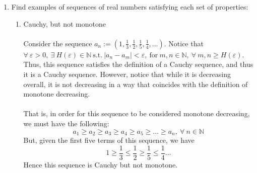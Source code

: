 \documentclass[12pt,letterpaper]{article}
\newcommand{\st}{\ \text{s.t.}\ }
\newcommand{\N}{\mathbb{N}}
\theoremstyle{case}
\theoremstyle{definition}
\begin{document}
\begin{enumerate}
\begin{enumerate}
\begin{proof}
			\end{proof}
			Now we want to find the limit of $(x_n)$. By \textit{Theorem 3.5.8}, we have that since $(x_n)$ is contractive, it is also convergent. Thus, we know that $\lim (x_n)=x$ exists, and since we also know that $\lim (x_{n+1})=\lim (x_n)=x$, we have the following:
			\begin{align*}
				x_{n+1} &=2 + \frac{1}{x_n}\ \ \ \ \ \left.\right| \lim \\
				x &=2+\frac{1}{x}\ \ \ \ \ \left.\right| \cdot x \\
				x^2 &= 2x + 1 \\
				x^2-2x-1 &= 0 \\
				x &= \frac{2 \pm \sqrt{4 - 4 \cdot 1 \cdot (-1)}}{2} \\
				x_a &= 1-\sqrt{2} < 2 \\
				x_b &= 1+\sqrt{2}>2
			\end{align*}
			By \textit{Lemma 0.1}, we know that $x_n \geq 2,\ \forall\ n \in \N$, and thus we know that $x_a<2$ can't be the limit. Thus, we can conclude that $\lim (x_n)=1 +\sqrt{2}$.
		\end{enumerate}
	
		\item Find examples of sequences of real numbers satisfying each set of properties:
		\begin{enumerate}
			\item Cauchy, but not monotone
			\\\\Consider the sequence $a_n:=(1,\frac{1}{3},\frac{1}{2},\frac{1}{5},\frac{1}{4}, \dots)$. Notice that $\forall\ \varepsilon > 0,\ \exists\ H(\varepsilon) \in \N \st |a_n-a_m|<\varepsilon,\ \text{for}\ m,n \in \N,\ \forall\ m,n \geq H(\varepsilon)$. Thus, this sequence satisfies the definition of a Cauchy sequence, and thus it is a Cauchy sequence. However, notice that while it is decreasing overall, it is not decreasing in a way that coincides with the definition of monotone decreasing. 
			\\\\That is, in order for this sequence to be considered monotone decreasing, we must have the following:
			\[a_1 \geq a_2 \geq a_3 \geq a_4 \geq a_5 \geq \dots \geq a_n,\ \forall\ n \in \N\]
			But, given the first five terms of this sequence, we have
			\[1 \geq \frac{1}{3} \leq \frac{1}{2} \geq \frac{1}{5} \leq \frac{1}{4} \dots\]
			Hence this sequence is Cauchy but not monotone.\\
			

\end{enumerate}
\end{enumerate}
\end{document}
